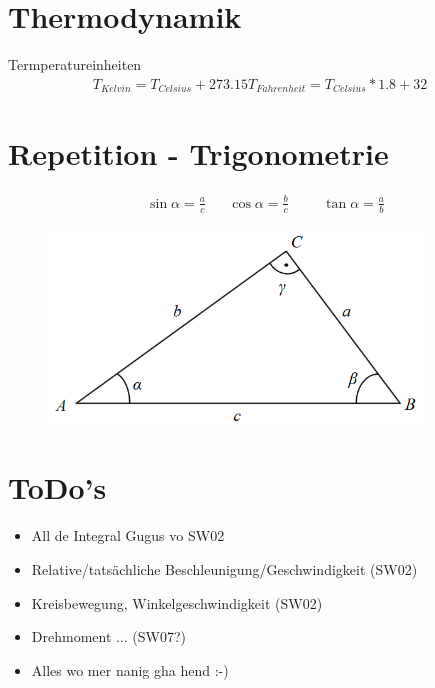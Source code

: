 \documentclass[17pt]{extarticle}
\begin{document}
	
\section{Thermodynamik}
	Termperatureinheiten
	\begin{align}
		T_{Kelvin} = T_{Celsius} + 273.15
		T_{Fahrenheit} = T_{Celsius} * 1.8 + 32
	\end{align}
\section{Repetition - Trigonometrie}
	\begin{align}
		&\sin \alpha = \frac{a}{c}
		&&\cos \alpha = \frac{b}{c}
		&&&\tan \alpha = \frac{a}{b}
	\end{align}
	\begin{figure}[h!]
		\centering
		\includegraphics[width=10cm]{img/Trigonometrie.png}
	\end{figure}

\section{ToDo's}
	\color{red}
	\begin{itemize}
		\item All de Integral Gugus vo SW02
		\item Relative/tatsächliche Beschleunigung/Geschwindigkeit (SW02)
		\item Kreisbewegung, Winkelgeschwindigkeit (SW02)
		\item Drehmoment ... (SW07?)
		\item Alles wo mer nanig gha hend :-)
	\end{itemize}
\end{document}
